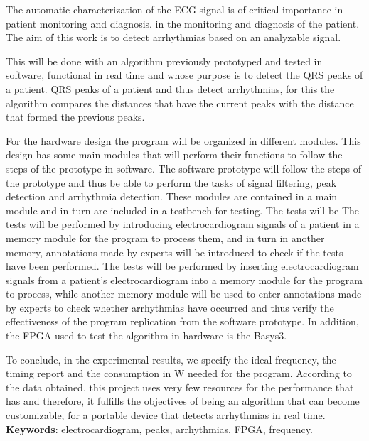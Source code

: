 The automatic characterization of the ECG signal is of critical importance in patient monitoring and diagnosis. 
	in the monitoring and diagnosis of the patient. 
	The aim of this work is to detect arrhythmias based on an analyzable signal.
    
    This will be done with an algorithm previously prototyped and tested in software, functional in real time and whose purpose is to detect the QRS peaks of a patient.
    QRS peaks of a patient and thus detect arrhythmias, for this the algorithm compares the distances that have the current peaks with the distance that formed the previous peaks.
    
    For the hardware design the program will be organized in different modules. This design has some main modules that will perform their functions to follow the steps of the prototype in software. 
    The software prototype will follow the steps of the prototype and thus be able to perform the tasks of signal filtering, peak detection and arrhythmia detection.
    These modules are contained in a main module and in turn are included in a testbench for testing. The tests will be 
    The tests will be performed by introducing electrocardiogram signals of a patient in a memory module for the program to process them, and in turn in another memory, annotations made by experts will be introduced to check if the tests have been performed. 
    The tests will be performed by inserting electrocardiogram signals from a patient's electrocardiogram into a memory module for the program to process, while another memory module will be used to enter annotations made by experts to check whether arrhythmias have occurred and thus verify the effectiveness of the program replication from the software prototype.  In addition, the FPGA 
    used to test the algorithm in hardware is the Basys3.
    
    To conclude, in the experimental results, we specify the ideal frequency, the timing report and the 
    consumption in W needed for the program. According to the data obtained, this project uses very few resources for the performance that has 
    and therefore, it fulfills the objectives of being an algorithm that can become customizable, for a portable device that detects arrhythmias in real time.
    \textbf{Keywords}: electrocardiogram, peaks, arrhythmias, FPGA, frequency.